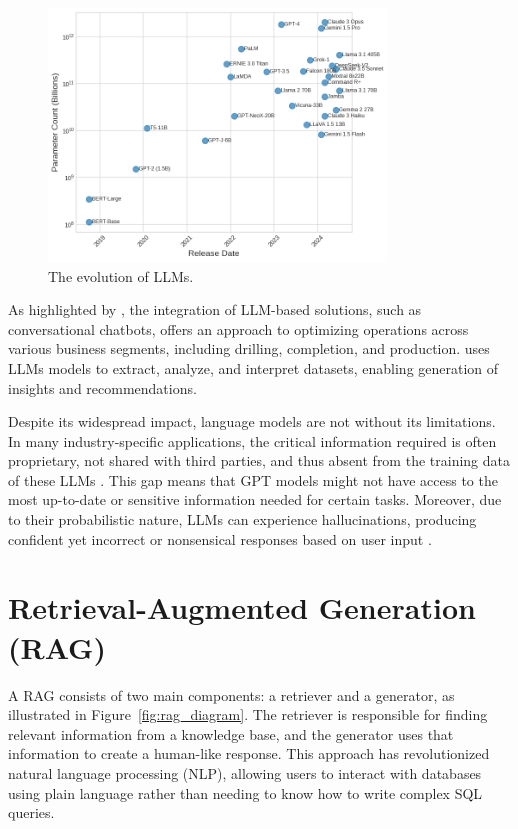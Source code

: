        \begin{figure}[ht]
            \centering
            \includegraphics[width=0.8\textwidth]{images/llm_evolution.png}
            \caption{The evolution of LLMs.}
            \label{fig:llm_evolution}
        \end{figure}
        
        As highlighted by \citet{Singh2023}, the integration of LLM-based solutions, such as conversational chatbots, offers an approach to optimizing operations across various business segments, including drilling, completion, and production.
        \citet{Singh2023} uses LLMs models to extract, analyze, and interpret datasets, enabling generation of insights and recommendations. 

        Despite its widespread impact, language models are not without its limitations. 
        In many industry-specific applications, the critical information required is often proprietary, not shared with third parties, and thus absent from the training data of these LLMs \citep{Mosser2024}. 
        This gap means that GPT models might not have access to the most up-to-date or sensitive information needed for certain tasks. 
        Moreover, due to their probabilistic nature, LLMs can experience hallucinations, producing confident yet incorrect or nonsensical responses based on user input \citep{OpenAI2023}. 


    \section{Retrieval-Augmented Generation (RAG)}

        A RAG consists of two main components: a retriever and a generator, as illustrated in Figure~\ref{fig:rag_diagram}. The retriever is responsible for finding relevant information from a knowledge base, and the generator uses that information to create a human-like response. This approach has revolutionized natural language processing (NLP), allowing users to interact with databases using plain language rather than needing to know how to write complex SQL queries.

